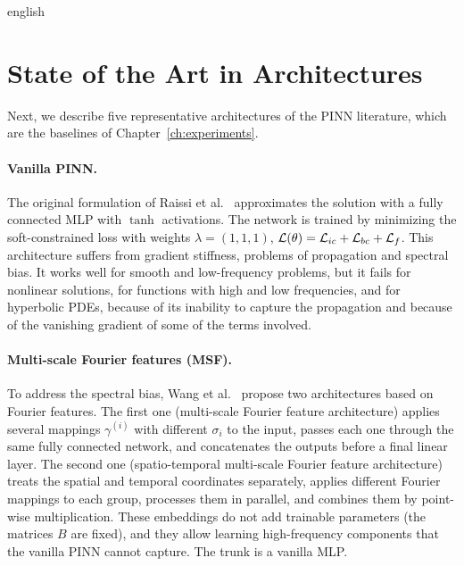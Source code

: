 \begin{hyphenrules}{english}
\section{State of the Art in Architectures}\label{sec:architectures}

Next, we describe five representative architectures of the PINN literature, which are the baselines of
Chapter~\ref{ch:experiments}.

\paragraph{Vanilla PINN.}
The original formulation of Raissi et al.~\cite{raissi2019} approximates the solution with a fully connected MLP
with $\tanh$ activations. The network is trained by minimizing the soft-constrained loss with weights
$\lambda=(1,1,1)$, $\mathcal{L}(\theta)=\mathcal{L}_{ic}+\mathcal{L}_{bc}+\mathcal{L}_f$. This architecture suffers from gradient
stiffness, problems of propagation and spectral bias. It works well for smooth and low-frequency
problems, but it fails for nonlinear solutions, for functions with high and low frequencies, and for
hyperbolic PDEs, because of its inability to capture the propagation and because of the vanishing gradient
of some of the terms involved.

\paragraph{Multi-scale Fourier features (MSF).}
To address the spectral bias, Wang et al.~\cite{wang2021eigenvector} propose two architectures based on Fourier
features. The first one (multi-scale Fourier feature architecture) applies several mappings
$\gamma^{(i)}$ with different $\sigma_i$ to the input, passes each one through the same fully connected
network, and concatenates the outputs before a final linear layer. The second one (spatio-temporal
multi-scale Fourier feature architecture) treats the spatial and temporal coordinates separately, applies
different Fourier mappings to each group, processes them in parallel, and combines them by point-wise
multiplication. These embeddings do not add trainable parameters (the matrices $B$ are fixed), and they
allow learning high-frequency components that the vanilla PINN cannot capture. The trunk is a vanilla MLP.


\end{hyphenrules}
